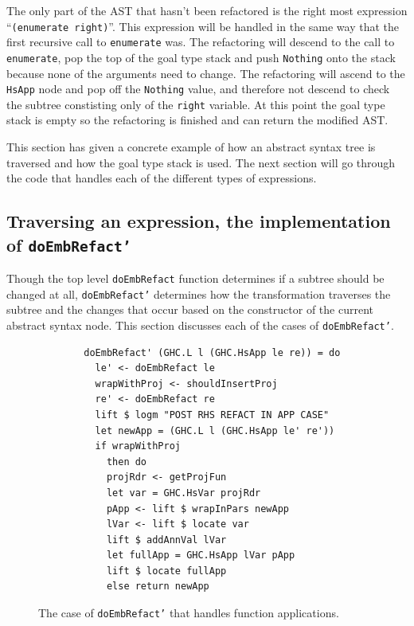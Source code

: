 The only part of the AST that hasn't been refactored is the right most expression ``\texttt{(enumerate right)}''. This expression will be handled in the same way that the first recursive call to \texttt{enumerate} was. The refactoring will descend to the call to \texttt{enumerate}, pop the top of the goal type stack and push \texttt{Nothing} onto the stack because none of the arguments need to change. The refactoring will ascend to the \texttt{HsApp} node and pop off the \texttt{Nothing} value, and therefore not descend to check the subtree constisting only of the \texttt{right} variable. At this point the goal type stack is empty so the refactoring is finished and can return the modified AST.

This section has given a concrete example of how an abstract syntax tree is traversed and how the goal type stack is used. The next section will go through the code that handles each of the different types of expressions.

\subsection{Traversing an expression, the implementation of \texttt{doEmbRefact'}}

Though the top level \texttt{doEmbRefact} function determines if a subtree should be changed at all, \texttt{doEmbRefact'} determines how the transformation traverses the subtree and the changes that occur based on the constructor of the current abstract syntax node. This section discusses each of the cases of \texttt{doEmbRefact'}.

\begin{figure}[t]
\begin{lstlisting}
        doEmbRefact' (GHC.L l (GHC.HsApp le re)) = do
          le' <- doEmbRefact le
          wrapWithProj <- shouldInsertProj       
          re' <- doEmbRefact re
          lift $ logm "POST RHS REFACT IN APP CASE"
          let newApp = (GHC.L l (GHC.HsApp le' re'))
          if wrapWithProj
            then do
            projRdr <- getProjFun
            let var = GHC.HsVar projRdr
            pApp <- lift $ wrapInPars newApp
            lVar <- lift $ locate var
            lift $ addAnnVal lVar
            let fullApp = GHC.HsApp lVar pApp
            lift $ locate fullApp
            else return newApp
\end{lstlisting}
\caption{The case of \texttt{doEmbRefact'} that handles function applications.}
\label{embRefactApp}
\end{figure}

